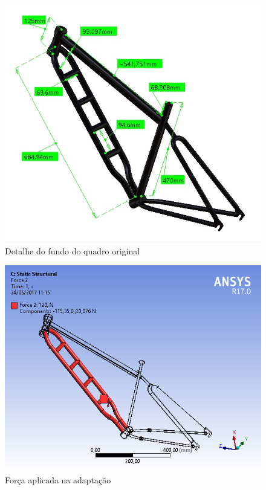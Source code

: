 	\graphicspath{{figuras/}}
	\begin{figure}[h!]
		\centering
		\includegraphics[scale=0.80]{inter_cotas.jpg}
		\caption{Detalhe do fundo do quadro original}
		\label{img:inter_cotas}
	\end{figure}
	
	\graphicspath{{figuras/}}
	\begin{figure}[h!]
		\centering
		\includegraphics[scale=0.60]{inter_F120.png}
		\caption{Força aplicada na adaptação}
		\label{img:inter_F120}
	\end{figure}
	
